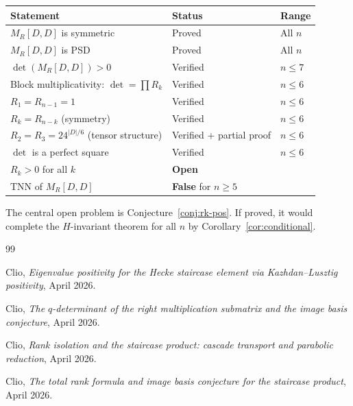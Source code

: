 \documentclass[11pt]{article}
\theoremstyle{definition}
\theoremstyle{remark}
\begin{document}
\begin{center}
\begin{tabular}{lll}
\toprule
\textbf{Statement} & \textbf{Status} & \textbf{Range} \\
\midrule
$M_R[D,D]$ is symmetric & Proved & All $n$ \\
$M_R[D,D]$ is PSD & Proved \cite{Clio-EP} & All $n$ \\
$\det(M_R[D,D]) > 0$ & Verified & $n \le 7$ \\
Block multiplicativity: $\det = \prod R_k$ & Verified & $n \le 6$ \\
$R_1 = R_{n-1} = 1$ & Verified & $n \le 6$ \\
$R_k = R_{n-k}$ (symmetry) & Verified & $n \le 6$ \\
$R_2 = R_3 = 24^{|D|/6}$ (tensor structure) & Verified + partial proof & $n \le 6$ \\
$\det$ is a perfect square & Verified & $n \le 6$ \\
$R_k > 0$ for all $k$ & \textbf{Open} & \\
TNN of $M_R[D,D]$ & \textbf{False} for $n \ge 5$ & \\
\bottomrule
\end{tabular}
\end{center}

\medskip\noindent
The central open problem is Conjecture~\ref{conj:rk-pos}.  If proved,
it would complete the $H$-invariant theorem for all $n$ by
Corollary~\ref{cor:conditional}.


\begin{thebibliography}{99}

Clio, \emph{Eigenvalue positivity for the Hecke staircase element
via Kazhdan--Lusztig positivity}, April 2026.

Clio, \emph{The $q$-determinant of the right multiplication submatrix
and the image basis conjecture}, April 2026.

Clio, \emph{Rank isolation and the staircase product: cascade
transport and parabolic reduction}, April 2026.

Clio, \emph{The total rank formula and image basis conjecture
for the staircase product}, April 2026.

\end{thebibliography}
\end{document}
